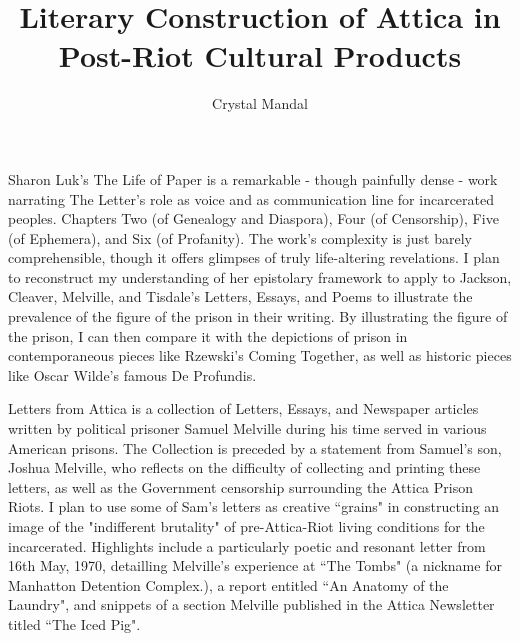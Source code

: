 \documentclass[14pt, letterpaper]{article}
\title{ \vspace*{-72pt} Literary Construction of Attica in Post-Riot Cultural Products }
\author{Crystal Mandal}
\date{}
\begin{document}
\maketitle



\begin{adjustwidth}{2.5ex}{0pt}

	Sharon Luk's The Life of Paper is a remarkable - though painfully dense - 
	work narrating The Letter's role as voice and as communication line for 
	incarcerated peoples. Chapters Two (of Genealogy and Diaspora), Four 
	(of Censorship), Five (of Ephemera), and Six (of Profanity). The work's 
	complexity is just barely comprehensible, though it offers glimpses of 
	truly life-altering revelations. I plan to reconstruct my understanding of 
	her epistolary framework to apply to Jackson, Cleaver, Melville, and 
	Tisdale's Letters, Essays, and Poems to illustrate the prevalence of the 
	figure of the prison in their writing. By illustrating the figure of the 
	prison, I can then compare it with the depictions of prison in 
	contemporaneous pieces like Rzewski's Coming Together, as well as historic 
	pieces like Oscar Wilde's famous De Profundis. 

\end{adjustwidth}

\clearpage


\begin{adjustwidth}{2.5em}{0pt}

	Letters from Attica is a collection of Letters, Essays, and 
	Newspaper articles written by political prisoner Samuel Melville 
	during his time served in various American prisons. The Collection 
	is preceded by a statement from Samuel's son, Joshua Melville, 
	who reflects on the difficulty of collecting and printing 
	these letters, as well as the Government censorship surrounding 
	the Attica Prison Riots. I plan to use some of Sam's letters as 
	creative ``grains" in constructing an image of the "indifferent 
	brutality" of pre-Attica-Riot living conditions for the incarcerated.
	Highlights include a particularly poetic and resonant letter from 
	16th May, 1970,  detailling Melville's experience at ``The Tombs" 
	(a nickname for Manhatton Detention Complex.), a report entitled 
	``An Anatomy of the Laundry", and snippets of a section Melville 
	published in the Attica Newsletter titled ``The Iced Pig". 

\end{adjustwidth}
\end{document}

